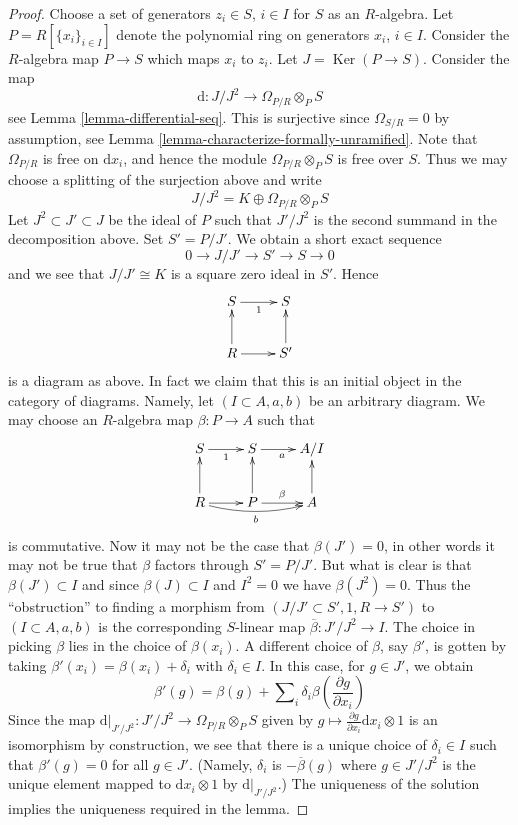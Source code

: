 \documentclass{amsart}
\theoremstyle{plain}
\theoremstyle{definition}
\theoremstyle{remark}
\numberwithin{equation}{subsection}
\def\Ker{\mathop{\mathrm{Ker}}}
\begin{document}
\begin{proof}
Choose a set of generators $z_i \in S$, $i \in I$ for $S$ as an $R$-algebra.
Let $P = R[\{x_i\}_{i \in I}]$ denote the polynomial ring on generators
$x_i$, $i \in I$. Consider the $R$-algebra map $P \to S$ which maps
$x_i$ to $z_i$. Let $J = \Ker(P \to S)$. Consider the map
$$
\text{d} : J/J^2 \longrightarrow \Omega_{P/R} \otimes_P S
$$
see
Lemma \ref{lemma-differential-seq}.
This is surjective since $\Omega_{S/R} = 0$ by assumption, see
Lemma \ref{lemma-characterize-formally-unramified}.
Note that $\Omega_{P/R}$ is free on $\text{d}x_i$, and hence the module
$\Omega_{P/R} \otimes_P S$ is free over $S$. Thus we may choose a splitting
of the surjection above and write
$$
J/J^2 = K \oplus \Omega_{P/R} \otimes_P S
$$
Let $J^2 \subset J' \subset J$ be the ideal of $P$ such that
$J'/J^2$ is the second summand in the decomposition above.
Set $S' = P/J'$. We obtain a short exact sequence
$$
0 \to J/J' \to S' \to S \to 0
$$
and we see that $J/J' \cong K$ is a square zero ideal in $S'$. Hence
$$
\xymatrix{
S \ar[r]_1 & S \\
R \ar[r] \ar[u] & S' \ar[u]
}
$$
is a diagram as above. In fact we claim that this is an initial object in
the category of diagrams. Namely, let $(I \subset A, a, b)$ be an arbitrary
diagram. We may choose an $R$-algebra map $\beta : P \to A$ such that
$$
\xymatrix{
S \ar[r]_1 & S \ar[r]_a & A/I \\
R \ar[r] \ar@/_/[rr]_b \ar[u] & P \ar[u] \ar[r]^\beta & A \ar[u]
}
$$
is commutative. Now it may not be the case that $\beta(J') = 0$, in other
words it may not be true that $\beta$ factors through $S' = P/J'$.
But what is clear is that $\beta(J') \subset I$ and
since $\beta(J) \subset I$ and $I^2 = 0$ we have $\beta(J^2) = 0$.
Thus the ``obstruction'' to finding a morphism from
$(J/J' \subset S', 1, R \to S')$ to $(I \subset A, a, b)$ is
the corresponding $S$-linear map $\overline{\beta} : J'/J^2 \to I$.
The choice in picking $\beta$ lies in the choice of $\beta(x_i)$.
A different choice of $\beta$, say $\beta'$, is gotten by taking
$\beta'(x_i) = \beta(x_i) + \delta_i$ with $\delta_i \in I$.
In this case, for $g \in J'$, we obtain
$$
\beta'(g) =
\beta(g) + \sum\nolimits_i \delta_i \beta(\frac{\partial g}{\partial x_i})
$$
Since the map $\text{d}|_{J'/J^2} : J'/J^2 \to \Omega_{P/R} \otimes_P S$
given by $g \mapsto \frac{\partial g}{\partial x_i}\text{d}x_i \otimes 1$
is an isomorphism by construction, we see that there is a unique choice
of $\delta_i \in I$ such that $\beta'(g) = 0$ for all $g \in J'$.
(Namely, $\delta_i$ is $-\overline{\beta}(g)$ where $g \in J'/J^2$
is the unique element mapped to $\text{d}x_i \otimes 1$
by $\text{d}|_{J'/J^2}$.) The uniqueness of the solution implies the
uniqueness required in the lemma.
\end{proof}
\end{document}
